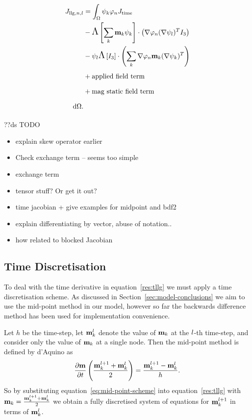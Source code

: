 \begin{align}
  J_{\text{llg},n,l} &= \int_{\Omega} {\psi_k} {\varphi_n} J_\text{time} \\
  &- \text{\Large{$\Lambda$}}\left[ \sum_k \mathbf{m}_k {\psi_k} \right] \cdot \left( \nabla {\varphi_n} (\nabla \psi_l)^T I_3 \right) \\
  &- \psi_l \text{\Large{$\Lambda$}}\left[ I_3 \right] \cdot \left( \sum_k \nabla {\varphi_n} \mathbf{m}_k (\nabla {\psi_k})^T \right) \\
  &+ \text{applied field term} \\
  &+ \text{mag static field term} \\
  {\; \text{d}} \Omega.
\end{align}

??ds TODO
\begin{itemize}
\item explain skew operator earlier
\item Check exchange term -- seems too simple
\item exchange term
\item tensor stuff? Or get it out?
\item time jacobian + give examples for midpoint and bdf2
\item explain differentiating by vector, abuse of notation..
\item how related to blocked Jacobian
\end{itemize}



\subsection{Time Discretisation}
\label{sec:time-discretisation-resi}

To deal with the time derivative in equation~\eqref{res:tllg} we must apply a time discretisation scheme. As discussed in Section~\ref{sec:model-conclusions} we aim to use the mid-point method in our model, however so far the backwards difference method has been used for implementation convenience.

Let $h$ be the time-step, let $\mathbf{m}_k^l$ denote the value of $\mathbf{m}_k$ at the $l$-th time-step, and consider only the value of $\mathbf{m}_k$ at a single node. Then the mid-point method is defined by d'Aquino\cite{DAquino2005} as
\begin{equation}
  \label{eq:mid-point-scheme}
  \frac{\partial \mathbf{m}}{\partial t} \left( \frac{\mathbf{m}_k^{l+1} + \mathbf{m}_k^l}{2} \right) = \frac{\mathbf{m}_k^{l+1} - \mathbf{m}_k^l}{ h}.
\end{equation}
So by substituting equation~\eqref{eq:mid-point-scheme} into equation~\eqref{res:tllg} with $\mathbf{m}_k = \frac{\mathbf{m}_k^{l+1} + \mathbf{m}^l_k}{2}$ we obtain a fully discretised system of equations for $\mathbf{m}_k^{l+1}$ in terms of $\mathbf{m}_k^l$.


